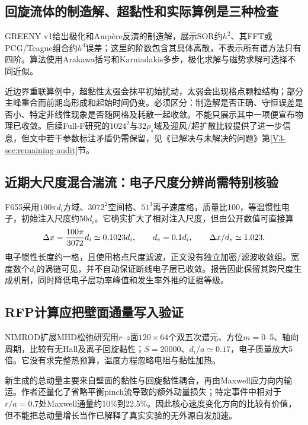 \documentclass[UTF8,a4paper,11pt,openany,fontset=fandol]{ctexbook}
\begin{document}
\subsection{回旋流体的制造解、超黏性和实际算例是三种检查}
GREENY v1\citep{E473}给出极化和Ampère反演的制造解，展示SOR约$h^2$、其FFT或PCG/Teague组合约$h^4$误差；这里的阶数包含其具体离散，不表示所有谱方法只有四阶。算法使用Arakawa括号和Karniadakis多步，极化求解与磁势求解可选择不同近似。

近边界重联算例中，超黏性太强会抹平初始扰动，太弱会出现格点颗粒结构；部分主峰重合而前期岛形成和起始时间仍变。必须区分：制造解是否正确、守恒误差是否小、特定非线性现象是否随网格及耗散一起收敛。不能只展示其中一项便宣布物理已收敛。后续Full-F研究\citep{L314}的$1024^2$与$32\rho_s$域及迎风/超扩散比较提供了进一步信息，但文中若干参数标注矛盾仍需保留，见《已解决与未解决的问题》第\ref{V3-sec:remaining-audit}节。

\subsection{近期大尺度混合湍流：电子尺度分辨尚需特别核验}
F655\citep{F655}采用$100\pi d_i$方域、$3072^2$空间格、$51^3$离子速度格，质量比100，等温惯性电子，初始注入尺度约$50d_i$。它确实扩大了相对注入尺度，但由公开数值可直接算
\begin{equation*}
 \Delta x={100\pi\over3072}d_i\simeq0.1023d_i,
 \qquad d_e=0.1d_i,\qquad\Delta x/d_e\simeq1.023.
\end{equation*}
电子惯性长度约一格，且使用格点尺度滤波，正文没有独立加密/滤波收敛组。宽度数个$d_i$的涡链可见，并不自动保证断线电子层已收敛。报告因此保留其跨尺度生成机制，同时降低电子层功率峰值和发生率外推的证据等级。

\subsection{RFP计算应把壁面通量写入验证}
NIMROD扩展MHD松弛研究\citep{F798}用$r$--$z$面$120\times64$个双五次谱元、方位$m=0$--5、轴向周期，比较有无Hall及离子回旋黏性；$S=20000$、$d_i/a\simeq0.17$，电子质量放大5倍。它没有求完整热预算，温度方程忽略电阻与黏性加热。

新生成的总动量主要来自壁面的黏性与回旋黏性耦合，再由Maxwell应力向内输运。作者还量化了省略平衡pinch流导致的额外动量损失；特定事件中相对于$r/a=0.7$处Maxwell通量约10\%到22.5\%。因此核心速度变化方向的比较有价值，但不能把总动量增长当作已解释了真实实验的无外源自发加速。
\end{document}
